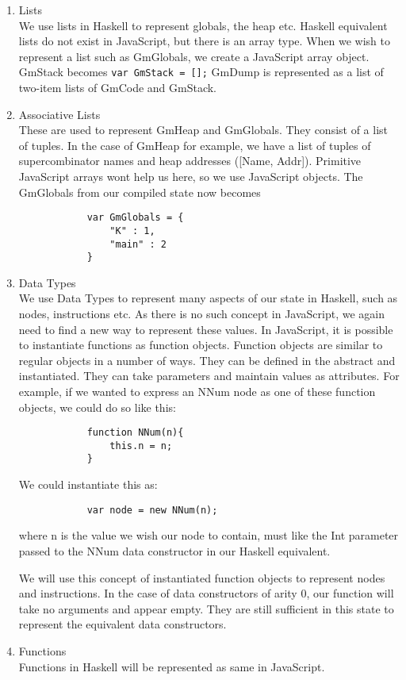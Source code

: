 \begin{enumerate}
	\item Lists\\
		  We use lists in Haskell to represent globals, the
		  heap etc. Haskell equivalent lists do not exist
		  in JavaScript, but there is an array type. When 
		  we wish to represent a list such as GmGlobals, we
		  create a JavaScript array object. GmStack becomes
		  \verb!var GmStack = [];!
		  GmDump is represented as a list of two-item lists 
		  of GmCode and GmStack.
	\item Associative Lists\\
		  These are used to represent GmHeap and GmGlobals.
		  They consist of a list of tuples. In the case of
		  GmHeap for example, we have a list of tuples of
		  supercombinator names and heap addresses ([Name,
		  Addr]). Primitive JavaScript arrays wont help
		  us here, so we use JavaScript objects. The 
		  GmGlobals from our compiled state now becomes 

		  \begin{verbatim}
		  	var GmGlobals = {
		  		"K" : 1,
		  		"main" : 2
		  	}
		  \end{verbatim}

	\item Data Types \\
		  We use Data Types to represent many aspects of 
		  our state in Haskell, such as nodes, instructions
		  etc. As there is no such concept in JavaScript, 
		  we again need to find a new way to represent these
		  values. In JavaScript, it is possible to instantiate
		  functions as function objects. Function objects are
		  similar to regular objects in a number of ways. They
		  can be defined in the abstract and instantiated. They
		  can take parameters and maintain values as attributes.
		  For example, if we wanted to express an NNum node as
		  one of these function objects, we could do so like
		  this:

		  \begin{verbatim}
		  	function NNum(n){
		  		this.n = n;
		  	}
		  \end{verbatim}

		  We could instantiate this as:

		  \begin{verbatim}
		  	var node = new NNum(n);
		  \end{verbatim}

		  where n is the value we wish our node to contain, 
		  must like the Int parameter passed to the NNum data
		  constructor in our Haskell equivalent. 

		  We will use this concept of instantiated function
		  objects to represent nodes and instructions. In the
		  case of data constructors of arity 0, our function
		  will take no arguments and appear empty. They are
		  still sufficient in this state to represent the
		  equivalent data constructors.

	\item Functions \\ 
		  Functions in Haskell will be represented as same in
		  JavaScript. 
\end{enumerate}


